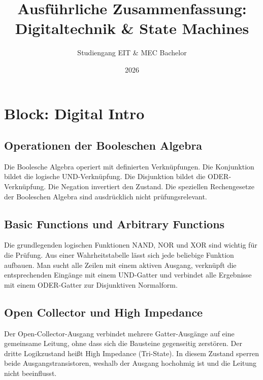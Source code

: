 \documentclass[11pt,a4paper]{article}
\title{Ausführliche Zusammenfassung: Digitaltechnik \& State Machines}
\author{Studiengang EIT \& MEC Bachelor}
\date{2026}
\begin{document}
\maketitle
\tableofcontents
\newpage

\section{Block: Digital Intro}

\subsection{Operationen der Booleschen Algebra}
Die Boolesche Algebra operiert mit definierten Verknüpfungen. Die Konjunktion bildet die logische UND-Verknüpfung. Die Disjunktion bildet die ODER-Verknüpfung. Die Negation invertiert den Zustand. Die speziellen Rechengesetze der Booleschen Algebra sind ausdrücklich nicht prüfungsrelevant.

\subsection{Basic Functions und Arbitrary Functions}
Die grundlegenden logischen Funktionen NAND, NOR und XOR sind wichtig für die Prüfung. Aus einer Wahrheitstabelle lässt sich jede beliebige Funktion aufbauen. Man sucht alle Zeilen mit einem aktiven Ausgang, verknüpft die entsprechenden Eingänge mit einem UND-Gatter und verbindet alle Ergebnisse mit einem ODER-Gatter zur Disjunktiven Normalform.

\subsection{Open Collector und High Impedance}
Der Open-Collector-Ausgang verbindet mehrere Gatter-Ausgänge auf eine gemeinsame Leitung, ohne dass sich die Bausteine gegenseitig zerstören. Der dritte Logikzustand heißt High Impedance (Tri-State). In diesem Zustand sperren beide Ausgangstransistoren, weshalb der Ausgang hochohmig ist und die Leitung nicht beeinflusst.
\end{document}

